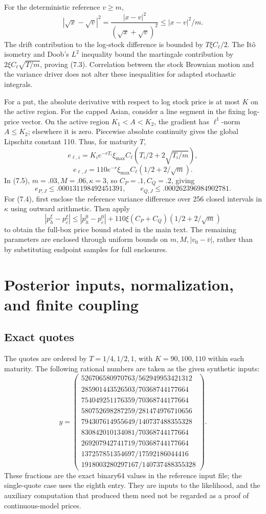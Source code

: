 \documentclass[11pt,a4paper]{article}
\begin{document}
For the deterministic reference \(v\ge m\),
\[
|\sqrt{x}-\sqrt v|^2
=\frac{|x-v|^2}{(\sqrt x+\sqrt v)^2}\le |x-v|^2/m.
\]
The drift contribution to the log-stock difference is bounded by \(T\xi C_\ell/2\).
The It\^o isometry and Doob's \(L^2\) inequality bound the martingale contribution by
\(2\xi C_\ell\sqrt{T/m}\), proving (7.3).
Correlation between the stock Brownian motion and the variance driver does not alter
these inequalities for adapted stochastic integrals.

For a put, the absolute derivative with respect to log stock price is at most \(K\)
on the active region.
For the capped Asian, consider a line segment in the fixing log-price vector.
On the active region \(K_1<A<K_2\), the gradient has \(\ell^1\)-norm \(A\le K_2\);
elsewhere it is zero.
Piecewise absolute continuity gives the global Lipschitz constant 110.
Thus, for maturity \(T\),
\[
e_{\ell,i}=K_i e^{-rT_i}\xi_{\max}C_\ell
\left(T_i/2+2\sqrt{T_i/m}\right),
\]
\[
e_{\ell,J}=110e^{-r}\xi_{\max}C_\ell
\left(1/2+2/\sqrt m\right).
\tag{E.3}
\]
In (7.5), \(m=.03,M=.06,\kappa=3\), so \(C_P=.1,C_Q=.2\), giving
\[
e_{P,J}\le.000131198492451391,\qquad
e_{Q,J}\le.000262396984902781.
\tag{E.4}
\]
For (7.4), first enclose the reference variance difference over 256 closed intervals
in \(\kappa\) using outward arithmetic. Then apply
\[
|p_h^\xi-p_c^\xi|
\le |p_h^0-p_c^0|+
110\xi(C_P+C_Q)(1/2+2/\sqrt m)
\]
to obtain the full-box price bound stated in the main text.
The remaining parameters are enclosed through uniform bounds on
\(m,M,|v_0-\bar v|\), rather than by substituting endpoint samples for full enclosures.

\section{Posterior inputs, normalization, and finite coupling}

\subsection{Exact quotes}

The quotes are ordered by \(T=1/4,1/2,1\), with \(K=90,100,110\) within each maturity.
The following rational numbers are taken as the given synthetic inputs:
\[
y=\begin{pmatrix}
526706580970763/562949953421312\\
285901443526503/70368744177664\\
754049251176359/70368744177664\\
580752698287259/281474976710656\\
794307614955649/140737488355328\\
830842010134081/70368744177664\\
269207942741719/70368744177664\\
137257851354697/17592186044416\\
1918003280297167/140737488355328
\end{pmatrix}.
\tag{F.1}
\]
These fractions are the exact binary64 values in the reference input file; the single-quote
case uses the eighth entry.
They are inputs to the likelihood, and the auxiliary computation that produced them
need not be regarded as a proof of continuous-model prices.
\end{document}
